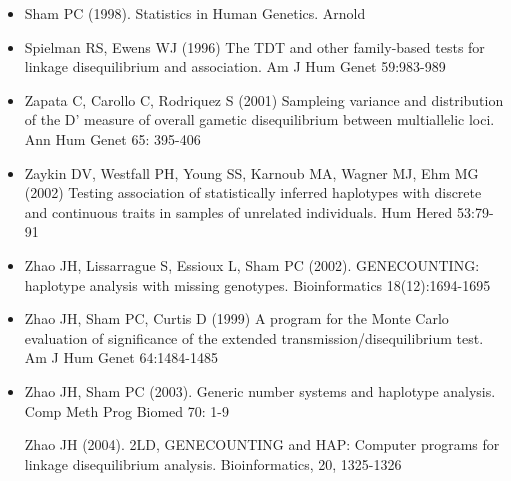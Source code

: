 \documentclass[10pt,a4paper]{article}
\begin{document}
\begin{itemize}
\item[] 
Sham PC (1998). Statistics in Human Genetics. Arnold

\item[] 
Spielman RS, Ewens WJ (1996) The TDT and other family-based tests for
linkage disequilibrium and association. Am J Hum Genet 59:983-989

\item[] 
Zapata C, Carollo C, Rodriquez S (2001) Sampleing variance and distribution
of the D' measure of overall gametic disequilibrium between multiallelic loci.
Ann Hum Genet 65: 395-406

\item[] 
Zaykin DV, Westfall PH, Young SS, Karnoub MA, Wagner MJ, Ehm MG (2002)
Testing association of statistically inferred haplotypes with discrete
and continuous traits in samples of unrelated individuals. Hum
Hered 53:79-91

\item[] 
Zhao JH, Lissarrague S, Essioux L, Sham PC (2002).
GENECOUNTING: haplotype analysis with missing genotypes.
Bioinformatics 18(12):1694-1695
 
\item[] 
Zhao JH, Sham PC, Curtis D (1999) A program for the Monte Carlo evaluation
of significance of the extended transmission/disequilibrium test.
Am J Hum Genet 64:1484-1485

\item[] 
Zhao JH, Sham PC (2003). Generic number systems and haplotype
analysis. Comp Meth Prog Biomed 70: 1-9

Zhao JH (2004). 2LD, GENECOUNTING and HAP: Computer programs for linkage
disequilibrium analysis. Bioinformatics, 20, 1325-1326 

\end{itemize}
\end{document}
